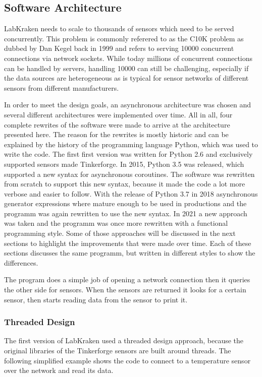 \subsection{Software Architecture}
LabKraken needs to scale to thousands of sensors which need to be served concurrently. This problem is commonly referered to as the C10K problem as dubbed by Dan Kegel back in 1999 \cite{10kProblem} and refers to serving \num{10000} concurrent connections via network sockets. While today millions of concurrent connections can be handled by servers, handling \num{10000} can still be challenging, especially if the data sources are heterogeneous as is typical for sensor networks of different sensors from different manufacturers.

In order to meet the design goals, an asynchronous architecture was chosen and several different architectures were implemented over time. All in all, four complete rewrites of the software were made to arrive at the architecture presented here. The reason for the rewrites is mostly historic and can be explained by the history of the programming language Python, which was used to write the code. The first first version was written for Python 2.6 and exclusively supported sensors made Tinkerforge. In 2015, Python 3.5 was released, which supported a new syntax for asynchronous coroutines. The software was rewritten from scratch to support this new syntax, because it made the code a lot more verbose and easier to follow. With the release of Python 3.7 in 2018 asynchronous generator expressions where mature enough to be used in productions and the programm was again rewritten to use the new syntax. In 2021 a new approach was taken and the programm was once more rewritten with a functional programming style. Some of those approaches will be discussed in the next sections to highlight the improvements that were made over time. Each of these sections discusses the same programm, but written in different styles to show the differences.

The program does a simple job of opening a network connection then it queries the other side for sensors. When the sensors are returned it looks for a certain sensor, then starts reading data from the sensor to print it.

\subsubsection{Threaded Design}
The first version of LabKraken used a threaded design approach, because the original libraries of the Tinkerforge sensors are built around threads. The following simplified example shows the code to connect to a temperature sensor over the network and read its data.

